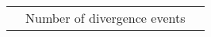 \documentclass[border=10pt,varwidth=30cm]{standalone}
\newcounter{subfloat}
\renewcommand{\thesubfloat}{\Alph{subfloat}}
\newcommand{\insertlabel}{%
    \small
    \stepcounter{subfloat}%
    \thesubfloat}
\newcommand{\trm}[1]{\ensuremath{\textrm{\sffamily #1}}}
\begin{document}
\begin{figure}
\begin{tabular}{@{}llll@{}}
        & \multicolumn{2}{c}{\large Number of divergence events} & 
    \end{tabular}
\end{figure}
\end{document}
